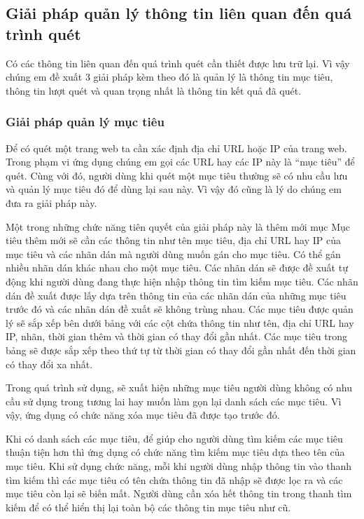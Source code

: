 \subsection{Giải pháp quản lý thông tin liên quan đến quá trình quét}

\tab Có các thông tin liên quan đến quá trình quét cần thiết được lưu trữ lại.
Vì vậy chúng em đề xuất 3 giải pháp kèm theo đó là quản lý là thông tin mục tiêu, thông tin lượt quét và quan trọng nhất là thông tin kết quả đã quét.

\subsubsection{Giải pháp quản lý mục tiêu}

\tab Để có quét một trang web ta cần xác định địa chỉ URL hoặc IP của trang web.
Trong phạm vi ứng dụng chúng em gọi các URL hay các IP này là “mục tiêu” để quét.
Cùng với đó, người dùng khi quét một mục tiêu thường sẽ có nhu cầu lưu và quản lý mục tiêu đó để dùng lại sau này.
Vì vậy đó cũng là lý do chúng em đưa ra giải pháp này.
\par

Một trong những chức năng tiên quyết của giải pháp này là thêm mới mục
Mục tiêu thêm mới sẽ cần các thông tin như tên mục tiêu, địa chỉ URL hay IP của mục tiêu và các nhãn dán mà người dùng muốn gán cho mục tiêu.
Có thể gán nhiều nhãn dán khác nhau cho một mục tiêu.
Các nhãn dán sẽ được đề xuất tự động khi người dùng đang thực hiện nhập thông tin tìm kiếm mục tiêu.
Các nhãn dán đề xuất được lấy dựa trên thông tin của các nhãn dán của những mục tiêu trước đó và các nhãn dán đề xuất sẽ không trùng nhau.
Các mục tiêu được quản lý sẽ sắp xếp bên dưới bảng với các cột chứa thông tin như tên, địa chỉ URL hay IP, nhãn, thời gian thêm và thời gian có thay đổi gần nhất.
Các mục tiêu trong bảng sẽ được sắp xếp theo thứ tự từ thời gian có thay đổi gần nhất đến thời gian có thay đổi xa nhất.
\par

Trong quá trình sử dụng, sẽ xuất hiện những mục tiêu người dùng không có nhu cầu sử dụng trong tương lai hay muốn làm gọn lại danh sách các mục tiêu.
Vì vậy, ứng dụng có chức năng xóa mục tiêu đã được tạo trước đó.
\par

Khi có danh sách các mục tiêu, để giúp cho người dùng tìm kiếm các mục tiêu thuận tiện hơn thì ứng dụng có chức năng tìm kiếm mục tiêu dựa theo tên của mục tiêu.
Khi sử dụng chức năng, mỗi khi người dùng nhập thông tin vào thanh tìm kiếm thì các mục tiêu có tên chứa thông tin đã nhập sẽ được lọc ra và các mục tiêu còn lại sẽ biến mất.
Người dùng cần xóa hết thông tin trong thanh tìm kiếm để có thể hiển thị lại toàn bộ các thông tin mục tiêu như cũ.
\par

